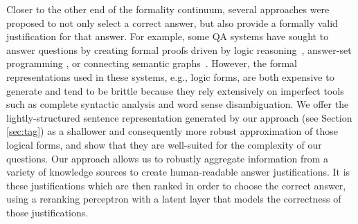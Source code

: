 Closer to the other end of the formality continuum, several approaches were proposed to not only select a correct answer, but also provide a formally valid justification for that answer.  For example, some QA systems have sought to answer questions by creating formal proofs driven by logic reasoning~\cite{moldovan2003cogex,moldovan2007cogex,balduccini2008knowledge,maccartney2009natural,liang2013learning,lewis2013combining}, answer-set programming \cite{baral2006using,baral2011towards,baral2012answering,baral2012knowledge}, or connecting semantic graphs~\cite{banarescu2012amr,sharmatowards}. 
However, the formal representations used in these systems, e.g., logic forms, are both expensive to generate 
and tend to be brittle because they rely extensively on imperfect tools such as complete syntactic analysis and word sense disambiguation.
We offer the lightly-structured sentence representation generated by our approach (see Section \ref{sec:tag}) as a shallower and consequently more robust approximation of those logical forms, and show that they are well-suited for the complexity of our questions.
Our approach allows us to robustly aggregate information from a variety of knowledge sources to create human-readable answer justifications.  
It is these justifications which are then ranked in order to choose the correct answer, using a reranking perceptron with a latent layer that models the correctness of those justifications.


